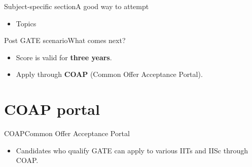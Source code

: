 \documentclass[handout]{beamer}
\begin{document}
\begin{frame}{Subject-specific section}{A good way to attempt}
    \begin{itemize}
        \item Topics
    \end{itemize}
\end{frame}

\begin{frame}{Post GATE scenario}{What comes next?}
    \begin{itemize}
        \item Score is valid for \textbf{three years}.
        \item Apply through \textbf{COAP} (Common Offer Acceptance Portal).
    \end{itemize}
\end{frame}

\section{COAP portal}
\begin{frame}{COAP}{Common Offer Acceptance Portal}
    \begin{itemize}
        \item Candidates who qualify GATE can apply to various IITs and IISc through COAP.
    \end{itemize}
\end{frame}
\end{document}

